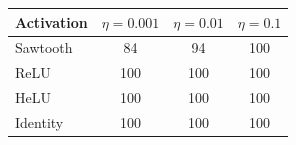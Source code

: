 \begin{tabular}{lccc}
\toprule
Activation & $\eta=0.001$ & $\eta=0.01$ & $\eta=0.1$ \\
\midrule
Sawtooth & 84 & 94 & 100 \\
ReLU & 100 & 100 & 100 \\
HeLU & 100 & 100 & 100 \\
Identity & 100 & 100 & 100 \\
\bottomrule
\end{tabular}
